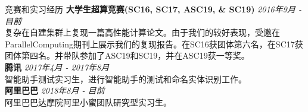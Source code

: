 \documentclass{resume} %
\begin{document}
\begin{rSection}{竞赛和实习经历}
    \textbf{大学生超算竞赛(SC16, SC17, ASC19, \& SC19)} \hfill {\em 2016年9月 - 目前}\\
    复杂在自建集群上复现一篇高性能计算论文。由于我们的较好表现，受邀在ParallelComputing期刊上展示我们的复现报告。在SC16获团体第六名，在SC17获团体第四名。并带队参加了ASC19和SC19，并在ASC19获一等奖。 \\
    \textbf{腾讯} \hfill {\em 2017年4月 - 2017年8月} \\
    智能助手测试实习生，进行智能助手的测试和命名实体识别工作。\\
    \textbf{阿里巴巴} \hfill {\em 2018年8月 - 目前}\\
    阿里巴巴达摩院阿里小蜜团队研究型实习生。
\end{rSection}
\end{document}
